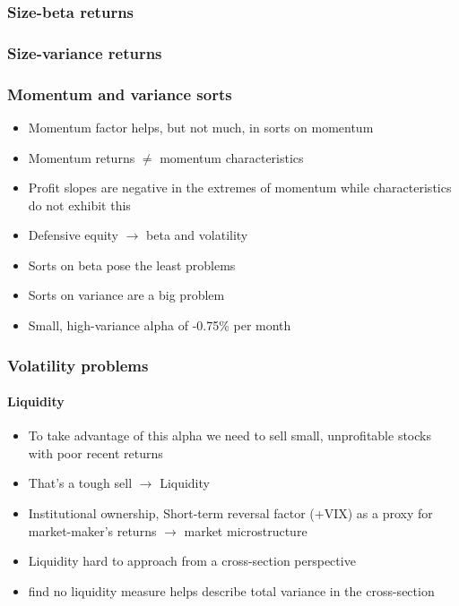 \documentclass[notes]{beamer}  %
\begin{document}

\begin{frame} \frametitle{Size-beta returns}
  \begin{center}
  \resizebox*{!}{\dimexpr\textheight-1.3cm\relax}{
    
    }
  \end{center}
\end{frame}


\begin{frame} \frametitle{Size-variance returns}
  \begin{center}
  \resizebox*{!}{\dimexpr\textheight-1.3cm\relax}{
    
    }
  \end{center}
\end{frame}


\begin{frame} \frametitle{Momentum and variance sorts}
  \begin{itemize}
    \item Momentum factor helps, but not much, in sorts on momentum
    \item Momentum returns $\neq$ momentum characteristics
    \item Profit slopes are negative in the extremes of momentum while
    characteristics do not exhibit this
    \item Defensive equity $\rightarrow$ beta and volatility
    \parencite{novy2014understanding}
    \item Sorts on beta pose the least problems
    \item Sorts on variance are a big problem
    \item Small, high-variance alpha of -0.75\% per month
  \end{itemize}
\end{frame}

\begin{frame} \frametitle{Volatility problems} \framesubtitle{Liquidity}
  \begin{itemize}
    \item To take advantage of this alpha we need to sell small,
    unprofitable stocks with poor recent returns
    \item That's a tough sell $\rightarrow$ Liquidity
    \parencite{nagel2005short, nagel2012evaporating}
    \item Institutional ownership, Short-term reversal factor (+VIX) as a proxy
    for market-maker's returns $\rightarrow$ market microstructure
    \item Liquidity hard to approach from a cross-section perspective
    \item \textcite{ang2006cross} find no liquidity measure helps describe
    total variance in the cross-section
  \end{itemize}
\end{frame}
\end{document}
